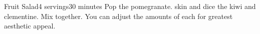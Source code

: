 \documentclass[../Cookbook.tex]{subfiles}
\begin{document}
\begin{recipe}[FruitSalad]{Fruit Salad}{4 servings}{30 minutes}
Pop the pomegranate. skin and dice the kiwi and clementine. Mix together. You can adjust the amounts of each for greatest aesthetic appeal.
\end{recipe}
\end{document}
